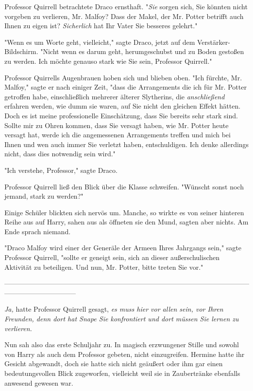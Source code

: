 {Professor Quirrell betrachtete Draco ernsthaft. "\emph{Sie} sorgen sich, Sie könnten nicht vorgeben zu verlieren, Mr. Malfoy? Dass der Makel, der Mr. Potter betrifft auch Ihnen zu eigen ist? \emph{Sicherlich} hat Ihr Vater Sie besseres gelehrt."

"Wenn es um Worte geht, vielleicht," sagte Draco, jetzt auf dem Verstärker-Bildschirm. "Nicht wenn es darum geht, herumgeschubst und zu Boden gestoßen zu werden. Ich möchte genauso stark wie Sie sein, Professor Quirrell."

Professor Quirrells Augenbrauen hoben sich und blieben oben. "Ich fürchte, Mr. Malfoy," sagte er nach einiger Zeit, "dass die Arrangements die ich für Mr. Potter getroffen habe, einschließlich mehrerer älterer Slytherins, die \emph{anschließend} erfahren werden, wie dumm sie waren, auf Sie nicht den gleichen Effekt hätten. Doch es ist meine professionelle Einschätzung, dass Sie bereits sehr stark sind. Sollte mir zu Ohren kommen, dass Sie versagt haben, wie Mr. Potter heute versagt hat, werde ich die angemessenen Arrangements treffen und mich bei Ihnen und wen auch immer Sie verletzt haben, entschuldigen. Ich denke allerdings nicht, dass dies notwendig sein wird."

"Ich verstehe, Professor," sagte Draco.

Professor Quirrell ließ den Blick über die Klasse schweifen. "Wünscht sonst noch jemand, stark zu werden?"

Einige Schüler blickten sich nervös um. Manche, so wirkte es von seiner hinteren Reihe aus auf Harry, sahen aus als öffneten sie den Mund, sagten aber nichts. Am Ende sprach niemand.

"Draco Malfoy wird einer der Generäle der Armeen Ihres Jahrgangs sein," sagte Professor Quirrell, "sollte er geneigt sein, sich an dieser außerschulischen Aktivität zu beteiligen. Und nun, Mr. Potter, bitte treten Sie vor."

--------------------------------------------------------------------------------------------------------------------------------------------

\emph{Ja,} hatte Professor Quirrell gesagt, \emph{es muss hier vor allen sein, vor Ihren Freunden, denn dort hat Snape Sie konfrontiert und dort müssen Sie lernen zu verlieren.}

Nun sah also das erste Schuljahr zu. In magisch erzwungener Stille und sowohl von Harry als auch dem Professor gebeten, nicht einzugreifen. Hermine hatte ihr Gesicht abgewandt, doch sie hatte sich nicht geäußert oder ihm gar einen bedeutungsvollen Blick zugeworfen, vielleicht weil sie in Zaubertränke ebenfalls anwesend gewesen war.

}
